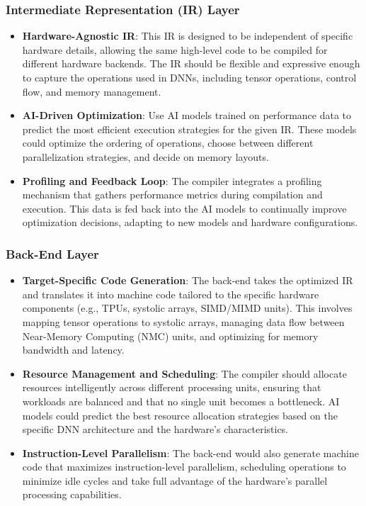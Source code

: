 \documentclass{article}
\begin{document}
\subsubsection{Intermediate Representation (IR) Layer}
\begin{itemize}
    \item \textbf{Hardware-Agnostic IR}: This IR is designed to be independent of specific hardware details, allowing the same high-level code to be compiled for different hardware backends. The IR should be flexible and expressive enough to capture the operations used in DNNs, including tensor operations, control flow, and memory management.
    \item \textbf{AI-Driven Optimization}: Use AI models trained on performance data to predict the most efficient execution strategies for the given IR. These models could optimize the ordering of operations, choose between different parallelization strategies, and decide on memory layouts.
    \item \textbf{Profiling and Feedback Loop}: The compiler integrates a profiling mechanism that gathers performance metrics during compilation and execution. This data is fed back into the AI models to continually improve optimization decisions, adapting to new models and hardware configurations.
\end{itemize}

\subsubsection{Back-End Layer}
\begin{itemize}
    \item \textbf{Target-Specific Code Generation}: The back-end takes the optimized IR and translates it into machine code tailored to the specific hardware components (e.g., TPUs, systolic arrays, SIMD/MIMD units). This involves mapping tensor operations to systolic arrays, managing data flow between Near-Memory Computing (NMC) units, and optimizing for memory bandwidth and latency.
    \item \textbf{Resource Management and Scheduling}: The compiler should allocate resources intelligently across different processing units, ensuring that workloads are balanced and that no single unit becomes a bottleneck. AI models could predict the best resource allocation strategies based on the specific DNN architecture and the hardware's characteristics.
    \item \textbf{Instruction-Level Parallelism}: The back-end would also generate machine code that maximizes instruction-level parallelism, scheduling operations to minimize idle cycles and take full advantage of the hardware's parallel processing capabilities.
\end{itemize}
\end{document}
